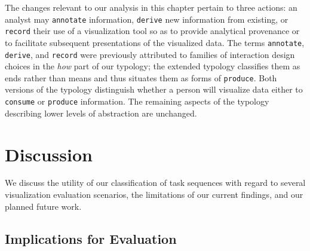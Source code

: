 The changes relevant to our analysis in this chapter pertain to three actions: an analyst may {\tt annotate} information, {\tt derive} new information from existing, or {\tt record} their use of a visualization tool so as to provide analytical provenance or to facilitate subsequent presentations of the visualized data. 
The terms {\tt annotate}, {\tt derive}, and {\tt record} were previously attributed to families of interaction design choices in the {\it how} part of our typology; the extended typology classifies them as ends rather than means and thus situates them as forms of {\tt produce}.
Both versions of the typology distinguish whether a person will visualize data either to {\tt consume} or {\tt produce} information. 
The remaining aspects of the typology describing lower levels of abstraction are unchanged. 


\section{Discussion}
\label{drvistasks:discussion}


We discuss the utility of our classification of task sequences with regard to several visualization evaluation scenarios, the limitations of our current findings, and our planned future work.


\subsection{Implications for Evaluation}
\label{drvistasks:discussion:evaluation}


